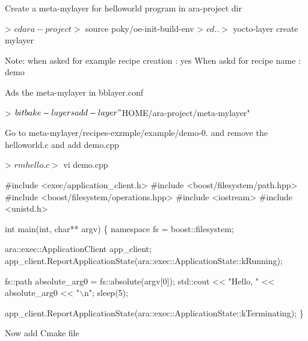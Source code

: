 \begin{DoxyItemize}
\item Create a meta-\/mylayer for helloworld program in ara-\/project dir 
\begin{DoxyCode}
>        $ cd ara-project
>        $ source poky/oe-init-build-env
>        $ cd ..
>        $ yocto-layer create mylayer
\end{DoxyCode}
 
\begin{DoxyCode}
Note: when asked for example recipe creation : yes
   When askd for recipe name             :  demo
\end{DoxyCode}

\item Ads the meta-\/mylayer in bblayer.\+conf 
\begin{DoxyCode}
>  $ bitbake-layers add-layer "$HOME/ara-project/meta-mylayer" 
\end{DoxyCode}

\item Go to meta-\/mylayer/recipes-\/exzmple/example/demo-\/0. and remove the helloworld.\+c and add demo.\+cpp 
\begin{DoxyCode}
>   $ rm hello.c
>   $ vi demo.cpp
\end{DoxyCode}
 
\begin{DoxyCode}
\textcolor{preprocessor}{#include <exec/application\_client.h>}
\textcolor{preprocessor}{#include <boost/filesystem/path.hpp>}
\textcolor{preprocessor}{#include <boost/filesystem/operations.hpp>}
\textcolor{preprocessor}{#include <iostream>}
\textcolor{preprocessor}{#include <unistd.h>}

\textcolor{keywordtype}{int} main(\textcolor{keywordtype}{int}, \textcolor{keywordtype}{char}** argv)
\{
    \textcolor{keyword}{namespace }fs = boost::filesystem;

    ara::exec::ApplicationClient app\_client;
    app\_client.ReportApplicationState(ara::exec::ApplicationState::kRunning);

    fs::path absolute\_arg0 = fs::absolute(argv[0]);
    std::cout << \textcolor{stringliteral}{"Hello, "} << absolute\_arg0 << \textcolor{stringliteral}{"\(\backslash\)n"};
    sleep(5);

    app\_client.ReportApplicationState(ara::exec::ApplicationState::kTerminating);
\}
\end{DoxyCode}

\item Now add Cmake file 
 

\end{DoxyItemize}
